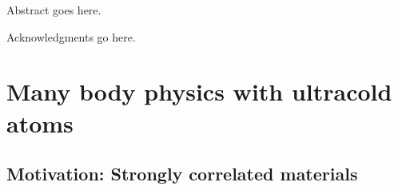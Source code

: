 \documentclass[oneside,11pt]{memoir}
\begin{document}
\pagestyle{plain}          %

\frontmatter
\thetitlepage



\riceabstract
\pagestyle{empty}  %

Abstract goes here. 

\pagestyle{plain} %

 
\riceacknowledgments

Acknowledgments go here. 


\tableofcontents*  %






\mainmatter
\pagestyle{rice}


\let\oldparskip\parskip
\setlength{\parskip}{0.8em}




\chapter{Many body physics with ultracold atoms } 

\section{ Motivation:  Strongly correlated materials }
\end{document}
